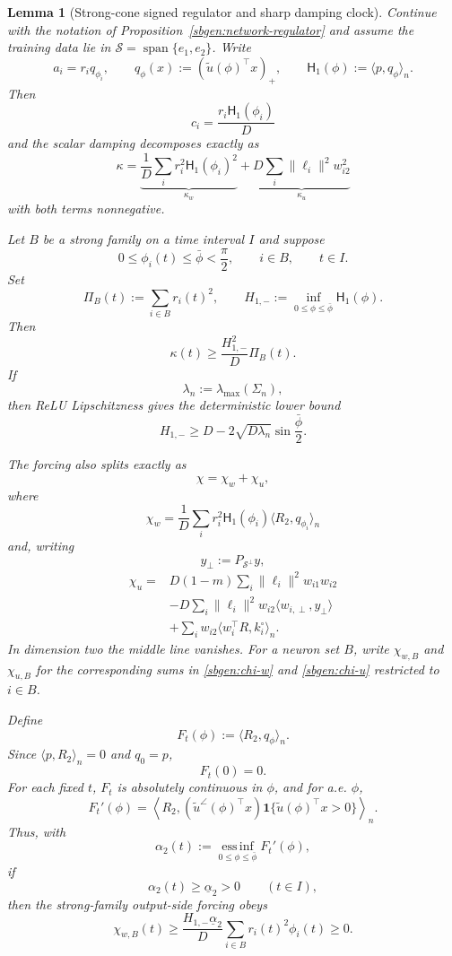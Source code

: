 \documentclass{article} %
\theoremstyle{plain}
\newtheorem{lemma}[theorem]{Lemma}
\theoremstyle{definition}
\theoremstyle{remark}
\begin{document}
\begin{lemma}[Strong-cone signed regulator and sharp damping clock]
\label{sbgen:strong-cone-regulator}
Continue with the notation of Proposition~\ref{sbgen:network-regulator} and
assume the training data lie in
$\mathcal S=\operatorname{span}\{e_1,e_2\}$.  Write
\[
a_i=r_iq_{\phi_i},
\qquad
q_\phi(x):=(\widetilde u(\phi)^\top x)_+,
\qquad
\mathsf H_1(\phi):=\langle p,q_\phi\rangle_n.
\]
Then
\[
c_i=\frac{r_i\mathsf H_1(\phi_i)}D
\]
and the scalar damping decomposes exactly as
\[
\boxed{
\kappa
=
\underbrace{\frac1D\sum_i r_i^2\mathsf H_1(\phi_i)^2}_{\kappa_w}
+
\underbrace{D\sum_i\|\ell_i\|^2w_{i2}^2}_{\kappa_u}
}
\tag{sbgen-kappa-split}\label{sbgen:kappa-split}
\]
with both terms nonnegative.

Let $B$ be a strong family on a time interval $I$ and suppose
\[
0\le\phi_i(t)\le\bar\phi<\frac\pi2,
\qquad i\in B,
\qquad t\in I.
\]
Set
\[
\Pi_B(t):=\sum_{i\in B}r_i(t)^2,
\qquad
H_{1,-}:=\inf_{0\le\phi\le\bar\phi}\mathsf H_1(\phi).
\]
Then
\[
\boxed{
\kappa(t)
\ge
\frac{H_{1,-}^2}{D}\Pi_B(t).
}
\tag{sbgen-sharp-clock}\label{sbgen:sharp-clock}
\]
If
\[
\lambda_n:=\lambda_{\max}(\Sigma_n),
\]
then ReLU Lipschitzness gives the deterministic lower bound
\[
\boxed{
H_{1,-}
\ge
D-2\sqrt{D\lambda_n}\sin\frac{\bar\phi}{2}.
}
\tag{sbgen-H1-lower}\label{sbgen:H1-lower}
\]

The forcing also splits exactly as
\[
\boxed{\chi=\chi_w+\chi_u,}
\tag{sbgen-chi-split}\label{sbgen:chi-split}
\]
where
\[
\boxed{
\chi_w
=
\frac1D\sum_i
r_i^2\mathsf H_1(\phi_i)
\langle R_2,q_{\phi_i}\rangle_n
}
\tag{sbgen-chi-w}\label{sbgen:chi-w}
\]
and, writing
\[
y_\perp:=P_{\mathcal S^\perp}y,
\]
\[
\boxed{
\begin{aligned}
\chi_u
={}&
D(1-m)\sum_i\|\ell_i\|^2w_{i1}w_{i2}
\\
&-
D\sum_i\|\ell_i\|^2w_{i2}
\langle w_{i,\perp},y_\perp\rangle
\\
&+
\sum_iw_{i2}\langle w_i^\top R,k_i^\circ\rangle_n.
\end{aligned}
}
\tag{sbgen-chi-u}\label{sbgen:chi-u}
\]
In dimension two the middle line vanishes.  For a neuron set $B$, write
$\chi_{w,B}$ and $\chi_{u,B}$ for the corresponding sums in
\eqref{sbgen:chi-w} and \eqref{sbgen:chi-u} restricted to $i\in B$.

Define
\[
F_t(\phi):=\langle R_2,q_\phi\rangle_n.
\]
Since $\langle p,R_2\rangle_n=0$ and $q_0=p$,
\[
F_t(0)=0.
\]
For each fixed $t$, $F_t$ is absolutely continuous in $\phi$, and for a.e.
$\phi$,
\[
\boxed{
F_t'(\phi)
=
\left\langle
R_2,
(\widetilde u^\angle(\phi)^\top x)
\mathbf1\{\widetilde u(\phi)^\top x>0\}
\right\rangle_n.
}
\tag{sbgen-Fprime}\label{sbgen:Fprime}
\]
Thus, with
\[
\alpha_2(t)
:=
\operatorname*{ess\,inf}_{0\le\phi\le\bar\phi}F_t'(\phi),
\]
if
\[
\alpha_2(t)\ge\underline\alpha_2>0
\qquad(t\in I),
\]
then the strong-family output-side forcing obeys
\[
\boxed{
\chi_{w,B}(t)
\ge
\frac{H_{1,-}\underline\alpha_2}{D}
\sum_{i\in B}r_i(t)^2\phi_i(t)
\ge0.
}
\tag{sbgen-chi-w-positive}\label{sbgen:chi-w-positive}
\]


\end{lemma}
\end{document}

